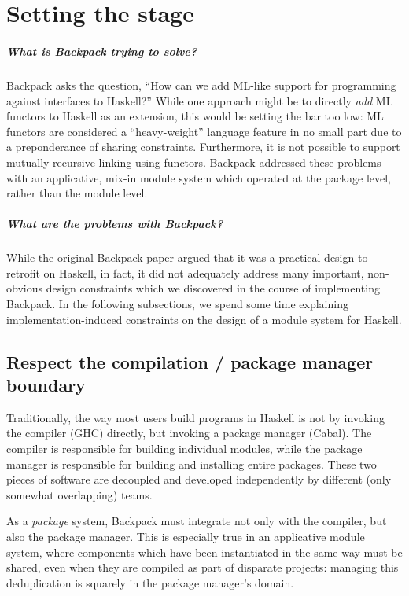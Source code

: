 \chapter{Setting the stage}

\paragraph{What is Backpack trying to solve?} Backpack asks the
question, ``How can we add ML-like support for programming against
interfaces to Haskell?''  While one approach might be to directly
\emph{add} ML functors to Haskell as an extension,  this would be setting the bar too low:
ML functors are considered a ``heavy-weight'' language feature in no
small part due to a preponderance of sharing constraints.  Furthermore,
it is not possible to support mutually recursive linking using functors.
Backpack addressed these problems with an applicative, mix-in module
system which operated at the package level, rather than the module
level.

\paragraph{What are the problems with Backpack?}  While the original
Backpack paper argued that it was a practical design to retrofit on
Haskell, in fact, it did not adequately address many important,
non-obvious design constraints which we discovered in the course of implementing
Backpack.  In the following subsections, we spend some time
explaining implementation-induced constraints on the design of a
module system for Haskell.

\section{Respect the compilation / package manager boundary}

Traditionally, the way most users build programs in Haskell is not by
invoking the compiler (GHC) directly, but invoking a package manager
(Cabal).  The compiler is responsible for building individual modules,
while the package manager is responsible for building and installing
entire packages.  These two pieces of software are decoupled and
developed independently by different (only somewhat overlapping) teams.

As a \emph{package} system, Backpack must integrate not only with
the compiler, but also the package manager.  This is especially true
in an applicative module system, where components which have been
instantiated in the same way must be shared, even when they are compiled
as part of disparate projects: managing this deduplication is squarely
in the package manager's domain.

